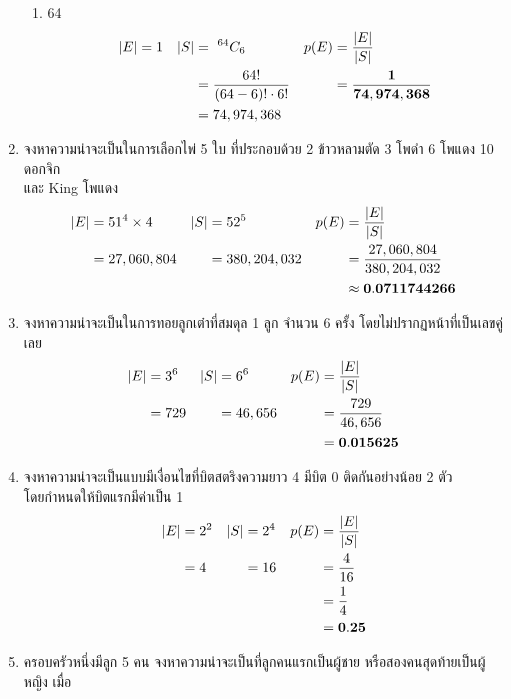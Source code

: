 \documentclass{article}
\begin{document}
\begin{enumerate}
\begin{enumerate}
	\item{64}
	\begin{align*}
	|E|	&= 1		&		|S|	&= ~^{64}C_6							&		p(E)	&= \frac{|E|}{|S|}					\notag \\
		&			&			&= \frac{64!}{(64 - 6)! \cdot 6!}		&				&= \mathbf{\frac{1}{74,974,368}}	\\
		&			&			&= 74,974,368
	\end{align*}
	
	\end{enumerate}
	
\item{จงหาความน่าจะเป็นในการเลือกไพ่ 5 ใบ ที่ประกอบด้วย 2 ข้าวหลามตัด 3 โพดำ 6 โพแดง 10 ดอกจิก \\
และ King โพแดง}
\begin{align*}
|E|	&= 51^4 \times 4		&		|S|	&= 52^5				&		p(E)	&= \frac{|E|}{|S|}					\notag \\
	&= 27,060,804			&			&= 380,204,032		&	 			&= \frac{27,060,804}{380,204,032}	\\
	&						&			&					&				&\approx \mathbf{0.0711744266}
\end{align*}

\item{จงหาความน่าจะเป็นในการทอยลูกเต๋าที่สมดุล 1 ลูก จำนวน 6 ครั้ง โดยไม่ปรากฏหน้าที่เป็นเลขคู่เลย}
\begin{align*}
|E|	&= 3^6		&		|S|	&= 6^6		&		p(E)	&= \frac{|E|}{|S|}		\notag \\
	&= 729		&			&= 46,656	&				&= \frac{729}{46,656}	\\
	&			&			&			&				&= \mathbf{0.015625}
\end{align*}

\item{จงหาความน่าจะเป็นแบบมีเงื่อนไขที่บิตสตริงความยาว 4 มีบิต 0 ติดกันอย่างน้อย 2 ตัว \\
โดยกำหนดให้บิตแรกมีค่าเป็น 1}
\begin{align*}
|E| &= 2^2		&		|S|	&= 2^4		&		p(E)	&= \frac{|E|}{|S|}		\notag \\
	&= 4 		&	 		&= 16 		&	 			&= \frac{4}{16}			\\
	&			&			&			&				&= \frac{1}{4}			\\
	&			&			&			&				&= \mathbf{0.25}
\end{align*}

\item{ครอบครัวหนึ่งมีลูก 5 คน จงหาความน่าจะเป็นที่ลูกคนแรกเป็นผู้ชาย หรือสองคนสุดท้ายเป็นผู้หญิง เมื่อ}
	\begin{enumerate}
	

\end{enumerate}
\end{enumerate}
\end{document}
